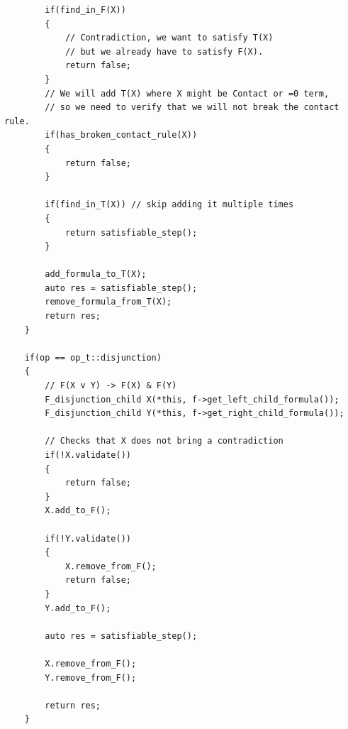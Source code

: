 \documentclass{article}
\begin{document}
\begin{lstlisting}
        if(find_in_F(X))
        {
            // Contradiction, we want to satisfy T(X)
            // but we already have to satisfy F(X).
            return false;
        }
        // We will add T(X) where X might be Contact or =0 term,
        // so we need to verify that we will not break the contact rule.
        if(has_broken_contact_rule(X))
        {
            return false;
        }

        if(find_in_T(X)) // skip adding it multiple times
        {
            return satisfiable_step();
        }

        add_formula_to_T(X);
        auto res = satisfiable_step();
        remove_formula_from_T(X);
        return res;
    }

    if(op == op_t::disjunction)
    {
        // F(X v Y) -> F(X) & F(Y)
        F_disjunction_child X(*this, f->get_left_child_formula());
        F_disjunction_child Y(*this, f->get_right_child_formula());

        // Checks that X does not bring a contradiction
        if(!X.validate())
        {
            return false;
        }
        X.add_to_F();

        if(!Y.validate())
        {
            X.remove_from_F();
            return false;
        }
        Y.add_to_F();

        auto res = satisfiable_step();

        X.remove_from_F();
        Y.remove_from_F();

        return res;
    }

\end{lstlisting}
\newpage
\end{document}

